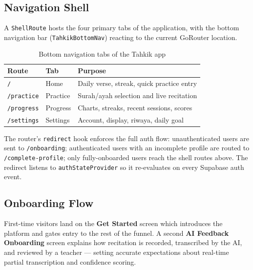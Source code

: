 \subsection{Navigation Shell}

A \texttt{ShellRoute} hosts the four primary tabs of the application, with the bottom navigation bar (\texttt{TahkikBottomNav}) reacting to the current GoRouter location.

\begin{table}[H]
  \centering
  \caption{Bottom navigation tabs of the Tahkik app}
  \label{tab:impl_app_tabs}
  \renewcommand{\arraystretch}{1.3}
  \begin{tabular}{llp{7cm}}
    \toprule
    \textbf{Route} & \textbf{Tab} & \textbf{Purpose} \\
    \midrule
    \texttt{/}          & Home     & Daily verse, streak, quick practice entry \\
    \texttt{/practice}  & Practice & Surah/ayah selection and live recitation \\
    \texttt{/progress}  & Progress & Charts, streaks, recent sessions, scores \\
    \texttt{/settings}  & Settings & Account, display, riwaya, daily goal \\
    \bottomrule
  \end{tabular}
\end{table}

The router's \texttt{redirect} hook enforces the full auth flow: unauthenticated users are sent to \texttt{/onboarding}; authenticated users with an incomplete profile are routed to \texttt{/complete-profile}; only fully-onboarded users reach the shell routes above. The redirect listens to \texttt{authStateProvider} so it re-evaluates on every Supabase auth event.

\subsection{Onboarding Flow}

First-time visitors land on the \textbf{Get Started} screen which introduces the platform and gates entry to the rest of the funnel. A second \textbf{AI Feedback Onboarding} screen explains how recitation is recorded, transcribed by the AI, and reviewed by a teacher --- setting accurate expectations about real-time partial transcription and confidence scoring.


